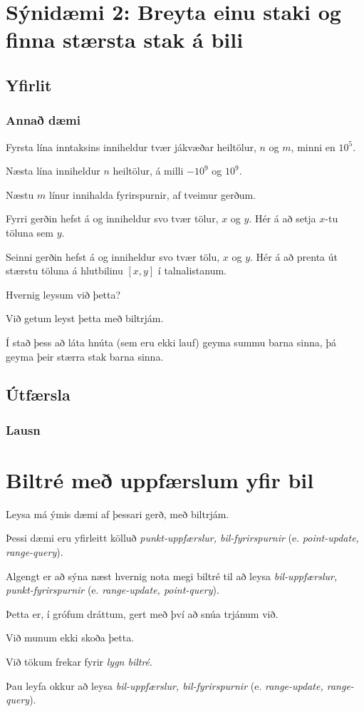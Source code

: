 \section{Sýnidæmi 2: Breyta einu staki og finna stærsta stak á bili}
\subsection{Yfirlit}
{
	\frametitle{Annað dæmi}
	{
		\item<1-> Fyrsta lína inntaksins inniheldur tvær jákvæðar heiltölur, $n$ og $m$, minni en $10^5$.
		\item<2-> Næsta lína inniheldur $n$ heiltölur, á milli $-10^9$ og $10^9$.
		\item<3-> Næstu $m$ línur innihalda fyrirspurnir, af tveimur gerðum. 
		\item<4-> Fyrri gerðin hefst á  og inniheldur svo tvær tölur, $x$ og $y$. Hér á að setja $x$-tu töluna sem $y$.
		\item<5-> Seinni gerðin hefst á  og inniheldur svo tvær tölu,
			$x$ og $y$. Hér á að prenta út stærstu töluna á hlutbilinu $[x, y]$ í talnalistanum.
		\item<6-> Hvernig leysum við þetta?
	}
}

{
	{
		\item<1-> Við getum leyst þetta með biltrjám.
		\item<2-> Í stað þess að láta hnúta (sem eru ekki lauf) geyma summu barna sinna, þá geyma þeir stærra stak barna sinna.
	}
}

\subsection{Útfærsla}
{
	\frametitle{Lausn}
}

\section{Biltré með uppfærslum yfir bil}
{
	{
		\item<1-> Leysa má ýmis dæmi af þessari gerð, með biltrjám.
		\item<2-> Þessi dæmi eru yfirleitt kölluð \emph{punkt-uppfærslur, bil-fyrirspurnir} (e. \emph{point-update, range-query}).
		\item<3-> Algengt er að sýna næst hvernig nota megi biltré til að leysa \emph{bil-uppfærslur, punkt-fyrirspurnir}
					(e. \emph{range-update, point-query}).
		\item<4-> Þetta er, í grófum dráttum, gert með því að snúa trjánum við.
		\item<5-> Við munum ekki skoða þetta.
		\item<6-> Við tökum frekar fyrir \emph{lygn biltré}.
		\item<7-> Þau leyfa okkur að leysa \emph{bil-uppfærslur, bil-fyrirspurnir} (e. \emph{range-update, range-query}).
	}
}

